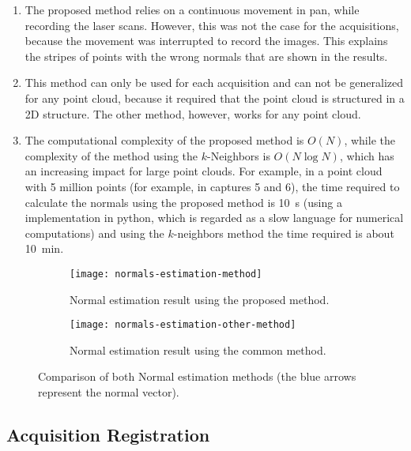\begin{enumerate}
    \item The proposed method relies on a continuous movement in pan, while recording the laser scans. However, this was not the case for the acquisitions, because the movement was interrupted to record the images. This explains the stripes of points with the wrong normals that are shown in the results.
    \item This method can only be used for each acquisition and can not be generalized for any point cloud, because it required that the point cloud is structured in a 2D structure. The other method, however, works for any point cloud.
    \item The computational complexity of the proposed method is $O(N)$, while the complexity of the method using the $k$-Neighbors is $O(N \log N)$, which has an increasing impact for large point clouds. For example, in a point cloud with 5 million points (for example, in captures 5 and 6), the time required to calculate the normals using the proposed method is \SI{10}{\second} (using a implementation in python, which is regarded as a slow language for numerical computations) and using the $k$-neighbors method the time required is about \SI{10}{\minute}.
\end{enumerate}

\begin{figure}[h]
    
    \centering
    \begin{subfigure}[t]{\textwidth}
        \centering
        \texttt{[image: normals-estimation-method]}
        \caption{Normal estimation result using the proposed method.}
        \label{figure:normals-estimation-method}
    \end{subfigure}

    \begin{subfigure}[t]{\textwidth}
        \centering
        \texttt{[image: normals-estimation-other-method]}
        \caption{Normal estimation result using the common method.}
        \label{figure:normals-estimation-other-method}
    \end{subfigure}

    \caption{Comparison of both Normal estimation methods (the blue arrows represent the normal vector).}
    \label{figure:normal-estimation-results}

\end{figure}

\subsection{Acquisition Registration}

